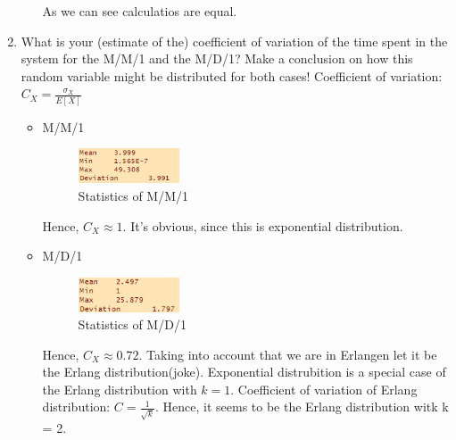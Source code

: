 \documentclass{homework}
\begin{document}
\begin{enumerate}[label=(\alph*)]
\begin{enumerate}[label=(\roman*)]
	As we can see calculatios are equal.
	\end{enumerate}
	\item What is your (estimate of the) coefficient of variation of the time spent in the system for the M/M/1 and the M/D/1? Make a conclusion on how this random variable might be distributed for both cases!
	\newpage
	 Coefficient of variation: $C_X = \frac{\sigma_X}{E[X]}$
	\begin{itemize}
		\item M/M/1
		\begin{figure}[hbt!]
			\centering
			\includegraphics[width=0.3\textwidth]{O_MM1.png}
			\caption{Statistics of M/M/1}
		\end{figure}

		Hence, $C_X \approx 1$. It's obvious, since this is exponential distribution.
		\item M/D/1
		\begin{figure}[hbt!]
			\centering
			\includegraphics[width=0.3\textwidth]{O_MD1.png}
			\caption{Statistics of M/D/1}
		\end{figure}

		Hence, $C_X \approx 0.72$.
		Taking into account that we are in Erlangen let it be the Erlang distribution(joke). Exponential distrubition is a special case of the Erlang distribution with $k=1$. Coefficient of variation of Erlang distribution: $C = \frac{1}{\sqrt{k}}$. Hence, it seems to be the Erlang distribution witk k = 2.
	\end{itemize}
\end{enumerate}
\end{document}
